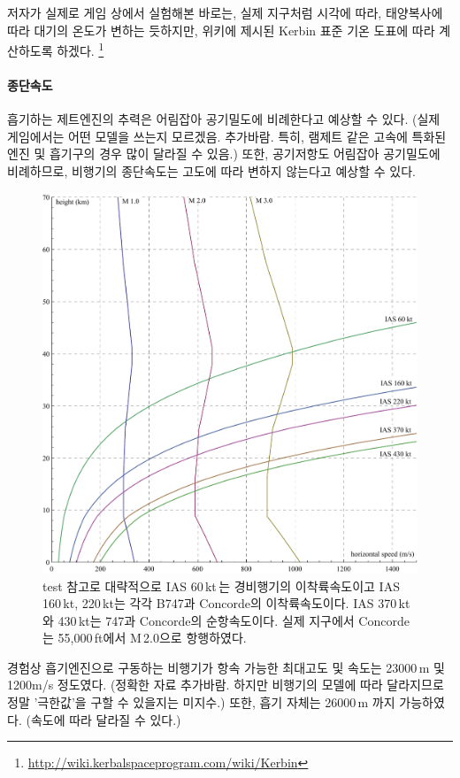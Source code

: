 \documentclass[9pt]{amsbook}
\begin{document}
저자가 실제로 게임 상에서 실험해본 바로는, 실제 지구처럼 시각에 따라, 태양복사에 따라 대기의 온도가 변하는 듯하지만, 위키에 제시된 Kerbin 표준 기온 도표에 따라 계산하도록 하겠다. \footnote{\url{http://wiki.kerbalspaceprogram.com/wiki/Kerbin}}

\paragraph{종단속도}
흡기하는 제트엔진의 추력은 어림잡아 공기밀도에 비례한다고 예상할 수 있다. (실제 게임에서는 어떤 모델을 쓰는지 모르겠음. 추가바람. 특히, 램제트 같은 고속에 특화된 엔진 및 흡기구의 경우 많이 달라질 수 있음.) 또한, 공기저항도 어림잡아 공기밀도에 비례하므로, 비행기의 종단속도는 고도에 따라 변하지 않는다고 예상할 수 있다.
\begin{figure}
\includegraphics[width=\textwidth]{ias.pdf}
\caption{test 참고로 대략적으로 IAS 60\,kt\,는 경비행기의 이착륙속도이고 IAS 160\,kt, 220\,kt는 각각 B747과 Concorde의 이착륙속도이다. IAS 370\,kt와 430\,kt는 747과 Concorde의 순항속도이다. 실제 지구에서 Concorde는 55,000\,ft에서 M\,2.0으로 항행하였다.}
\end{figure}

경험상 흡기엔진으로 구동하는 비행기가 항속 가능한 최대고도 및 속도는 23000\,m 및 1200m/s 정도였다. (정확한 자료 추가바람. 하지만 비행기의 모델에 따라 달라지므로 정말 '극한값'을 구할 수 있을지는 미지수.) 
또한, 흡기 자체는 26000\,m 까지 가능하였다. (속도에 따라 달라질 수 있다.)
\end{document}
